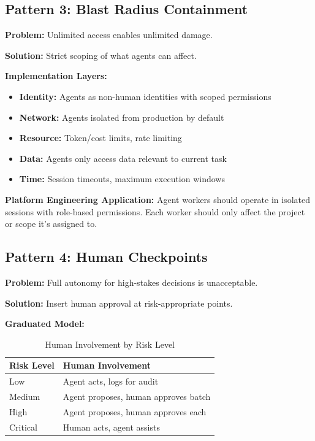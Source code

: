 \subsection{Pattern 3: Blast Radius Containment}
\label{subsec:blast-radius-containment}

\textbf{Problem:} Unlimited access enables unlimited damage.

\textbf{Solution:} Strict scoping of what agents can affect.

\textbf{Implementation Layers:}
\begin{itemize}
    \item \textbf{Identity:} Agents as non-human identities with scoped permissions
    \item \textbf{Network:} Agents isolated from production by default
    \item \textbf{Resource:} Token/cost limits, rate limiting
    \item \textbf{Data:} Agents only access data relevant to current task
    \item \textbf{Time:} Session timeouts, maximum execution windows
\end{itemize}

\textbf{Platform Engineering Application:}
Agent workers should operate in isolated sessions with role-based permissions. Each worker should only affect the project or scope it's assigned to.

\subsection{Pattern 4: Human Checkpoints}
\label{subsec:human-checkpoints}

\textbf{Problem:} Full autonomy for high-stakes decisions is unacceptable.

\textbf{Solution:} Insert human approval at risk-appropriate points.

\textbf{Graduated Model:}

\begin{table}[htbp]
\centering
\caption{Human Involvement by Risk Level}
\label{tab:human-involvement}
\begin{tabular}{ll}
\toprule
\textbf{Risk Level} & \textbf{Human Involvement} \\
\midrule
Low & Agent acts, logs for audit \\
Medium & Agent proposes, human approves batch \\
High & Agent proposes, human approves each \\
Critical & Human acts, agent assists \\
\bottomrule
\end{tabular}
\end{table}

